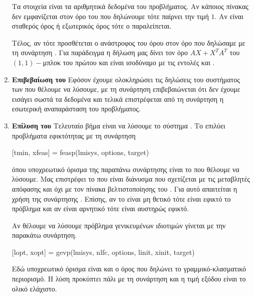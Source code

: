 \begin{enumerate}
        Τα στοιχεία  είναι τα αριθμητικά δεδομένα του προβλήματος. Αν
        κάποιος πίνακας δεν εμφανίζεται στον όρο του  που δηλώνουμε τότε
        παίρνει την τιμή \(1\). Αν είναι σταθερός όρος ή εξωτερικός όρος τότε ο
         παραλείπεται.

        Τέλος, αν  τότε προσθέτεται ο ανάστροφος του όρου στον
        όρο που δηλώσαμε με τη συνάρτηση . Για παράδειγμα η δήλωση
         μας δίνει τον όρο \(AX + X^TA^T\) 
        του \((1, 1)-\)μπλοκ του πρώτου  και είναι ισοδύναμο με τις εντολές 
         και .
    \item \textbf{Επιβεβαίωση του } Εφόσον έχουμε ολοκληρώσει τις
        δηλώσεις του συστήματος των  που θέλουμε να λύσουμε, με τη
        συνάρτηση  επιβεβαιώνεται ότι δεν έχουμε εισάγει σωστά τα
        δεδομένα και τελικά επιστρέφεται από τη συνάρτηση η εσωτερική αναπαράσταση 
        του προβλήματος.
    \item \textbf{Επίλυση του } Τελευταίο βήμα είναι να λύσουμε το
        σύστημα . Το  επιλύει προβλήματα εφικτότητας με τη
        συνάρτηση
        \begin{otherlanguage}{english}
            \begin{center}
                [tmin, xfeas] = feasp(lmisys, options, target)
            \end{center}
        \end{otherlanguage}
        όπου υποχρεωτικό όρισμα της παραπάνω συνάρτησης είναι το  που
        θέλουμε να λύσουμε. Μας επιστρέφει το  που είναι διάνυσμα
        που σχετίζεται με τις μεταβλητές απόφασης  και όχι με τον πίνακα
        βελτιστοποίησης του . Για αυτό απαιτείται η χρήση της συνάρτησης
        . Επίσης, αν το  είναι μη θετικό τότε είναι
        εφικτό το πρόβλημα και αν είναι αρνητικό τότε είναι αυστηρώς εφικτό.

        Αν θέλουμε να λύσουμε πρόβλημα γενικευμένων ιδιοτιμών γίνεται με την
        παρακάτω συνάρτηση.
        \begin{otherlanguage}{english}
            \begin{center}
                [lopt, xopt] = gevp(lmisys, nlfc, options, linit, xinit, target)
            \end{center}
        \end{otherlanguage}
        Εδώ υποχρεωτικό όρισμα είναι και ο όρος  που δηλώνει το
        γραμμικό-κλασματικό περιορισμό. Η λύση προκύπτει πάλι με τη συνάρτηση
         και η τιμή εξόδου  είναι το ολικό ελάχιστο.


\end{enumerate}
